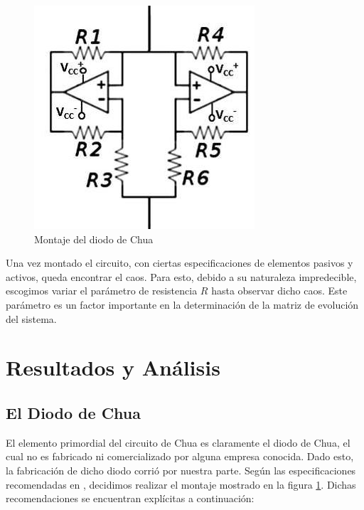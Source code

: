 \documentclass[%
 reprint,
 amsmath,amssymb,
 aps,
]{revtex4-1}
\begin{document}
\begin{figure}
\centering
\includegraphics[width=0.7\linewidth]{"diodoMontaje"}
\caption{Montaje del diodo de Chua}
\label{fig:diodoMontaje}
\end{figure}

Una vez montado el circuito, con ciertas especificaciones de elementos pasivos y activos, queda encontrar el caos. Para esto, debido a su naturaleza impredecible, escogimos variar el parámetro de resistencia $R$ hasta observar dicho caos. Este parámetro es un factor importante en la determinación de la matriz de evolución del sistema.\\

\section{\label{sec:level1}Resultados y An\'alisis}
\subsection{\label{sec:level2}El Diodo de Chua}

El elemento primordial del circuito de Chua es claramente el diodo de Chua, el cual no es fabricado ni comercializado por alguna empresa conocida. Dado esto, la fabricación de dicho diodo corrió por nuestra parte. Según las especificaciones recomendadas en \cite{pagina}, decidimos realizar el montaje mostrado en la figura \ref{fig:diodoMontaje}. Dichas recomendaciones se encuentran explícitas a continuación:\\
\end{document}
